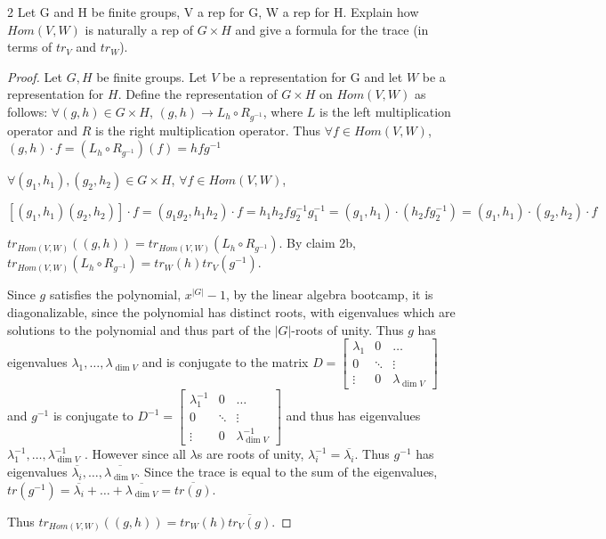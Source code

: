 \documentclass{article}
\begin{document}
\begin{PROB}{2}\label{Problem 2.}
    Let G and H be finite groups, V a rep for G, W a rep for H. Explain how $Hom(V,W)$ is naturally a rep of $G \times H$ and give a formula for the trace (in terms of $tr_V$ and $tr_W$). 
\end{PROB}
\begin{proof}
    Let $G, H$ be finite groups. Let $V$ be a representation for G and let $W$ be a representation for $H$. Define the representation of $G \times H$ on $Hom(V, W)$ as follows: $\forall (g, h) \in G \times H$, $(g, h) \to L_{h} \circ R_{g^{-1}}$, where $L$ is the left multiplication operator and $R$ is the right multiplication operator. Thus $\forall f \in Hom(V, W)$, $(g, h) \cdot f = (L_{h} \circ R_{g^{-1}})(f) = hfg^{-1}$  
    
    $\forall (g_1, h_1), (g_2, h_2) \in G \times H$, $\forall f \in Hom(V, W)$, 
    
    \[[(g_1, h_1)(g_2, h_2)]\cdot f = (g_1g_2, h_1h_2) \cdot f = h_1h_2fg_2^{-1}g_1^{-1} = (g_1, h_1) \cdot (h_2fg_2^{-1}) = (g_1, h_1) \cdot (g_2, h_2) \cdot f\]
    
    $tr_{Hom(V, W)}((g, h)) = tr_{Hom(V, W)}(L_h \circ R_{g^{-1}})$. By claim 2b, $tr_{Hom(V, W)}(L_h \circ R_{g^{-1}}) = tr_W(h) tr_V(g^{-1})$.
    
    Since $g$ satisfies the polynomial, $x^{|G|} - 1$, by the linear algebra bootcamp, it is diagonalizable, since the polynomial has distinct roots, with eigenvalues which are solutions to the polynomial and thus part of the $|G|$-roots of unity. Thus $g$ has eigenvalues $\lambda_1, \dots, \lambda_{\dim V}$ and is conjugate to the matrix $D = \begin{bmatrix}
        \lambda_1 & 0 & \hdots \\
        0 & \ddots & \vdots \\
        \vdots & 0 & \lambda_{\dim V}
    \end{bmatrix}$ and $g^{-1}$ is conjugate to $D^{-1} = \begin{bmatrix}
        \lambda_1^{-1} & 0 & \hdots \\
        0 & \ddots & \vdots \\
        \vdots & 0 & \lambda_{\dim V}^{-1}
    \end{bmatrix}$ and thus has eigenvalues $\lambda_1^{-1}, \dots, \lambda_{\dim V}^{-1}$ . However since all $\lambda$s are roots of unity, $\lambda_i^{-1} = \overline{\lambda_i}$. Thus $g^{-1}$ has eigenvalues $\overline{\lambda_i}, \dots, \overline{\lambda_{\dim V}}$. Since the trace is equal to the sum of the eigenvalues, $tr(g^{-1}) = \overline{\lambda_i}+ \dots+ \overline{\lambda_{\dim V}} = \overline{tr(g)}$.     
    
    Thus $tr_{Hom(V, W)}((g, h)) = tr_W(h)\overline{tr_V(g)}$.    
\end{proof}
\end{document}
